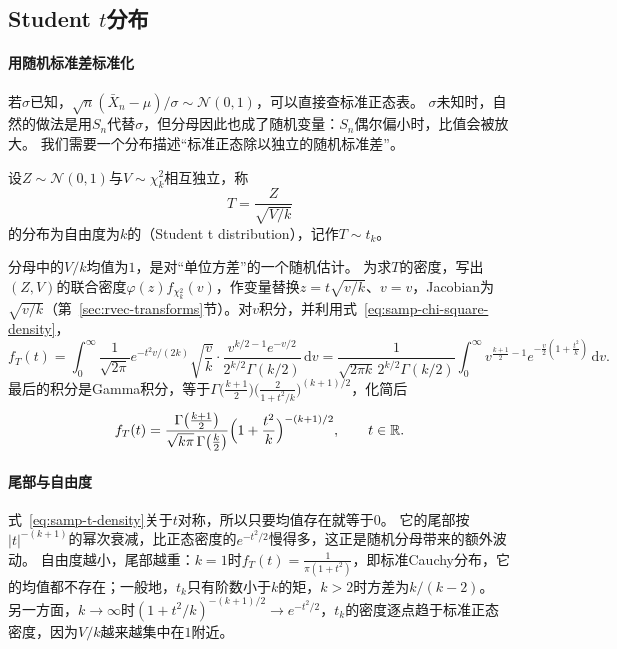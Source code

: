 \subsection{Student $t$分布}
\label{sec:samp-t}

\paragraph{用随机标准差标准化}
若$\sigma$已知，$\sqrt n(\bar X_n-\mu)/\sigma\sim\mathcal N(0,1)$，可以直接查标准正态表。
$\sigma$未知时，自然的做法是用$S_n$代替$\sigma$，但分母因此也成了随机变量：$S_n$偶尔偏小时，比值会被放大。
我们需要一个分布描述“标准正态除以独立的随机标准差”。

\begin{definition}[$t$分布]
\label{def:samp-t}
设$Z\sim\mathcal N(0,1)$与$V\sim\chi^2_k$相互独立，称
\[
  T=\frac{Z}{\sqrt{V/k}}
\]
的分布为自由度为$k$的（Student t distribution），记作$T\sim t_k$。
\end{definition}

分母中的$V/k$均值为$1$，是对“单位方差”的一个随机估计。
为求$T$的密度，写出$(Z,V)$的联合密度$\varphi(z)f_{\chi^2_k}(v)$，作变量替换$z=t\sqrt{v/k}$、$v=v$，Jacobian为$\sqrt{v/k}$（第~\ref{sec:rvec-transforms}节）。对$v$积分，并利用式~\eqref{eq:samp-chi-square-density}，
\[
  f_T(t)=\int_0^\infty\frac{1}{\sqrt{2\pi}}e^{-t^2v/(2k)}\sqrt{\frac vk}\cdot\frac{v^{k/2-1}e^{-v/2}}{2^{k/2}\Gamma(k/2)}\,\mathrm{d}v
  =\frac{1}{\sqrt{2\pi k}\,2^{k/2}\Gamma(k/2)}\int_0^\infty v^{\frac{k+1}2-1}e^{-\frac v2\left(1+\frac{t^2}k\right)}\,\mathrm{d}v.
\]
最后的积分是Gamma积分，等于$\Gamma\bigl(\frac{k+1}2\bigr)\bigl(\frac{2}{1+t^2/k}\bigr)^{(k+1)/2}$，化简后
\begin{equation}
  f_T(t)=\frac{\Gamma\bigl(\frac{k+1}2\bigr)}{\sqrt{k\pi}\,\Gamma\bigl(\frac k2\bigr)}\Bigl(1+\frac{t^2}{k}\Bigr)^{-(k+1)/2},\qquad t\in\mathbb{R}.
  \label{eq:samp-t-density}
\end{equation}

\paragraph{尾部与自由度}
式~\eqref{eq:samp-t-density}关于$t$对称，所以只要均值存在就等于$0$。
它的尾部按$|t|^{-(k+1)}$的幂次衰减，比正态密度的$e^{-t^2/2}$慢得多，这正是随机分母带来的额外波动。
自由度越小，尾部越重：$k=1$时$f_T(t)=\frac{1}{\pi(1+t^2)}$，即标准Cauchy分布，它的均值都不存在；一般地，$t_k$只有阶数小于$k$的矩，$k>2$时方差为$k/(k-2)$。
另一方面，$k\to\infty$时$(1+t^2/k)^{-(k+1)/2}\to e^{-t^2/2}$，$t_k$的密度逐点趋于标准正态密度，因为$V/k$越来越集中在$1$附近。

